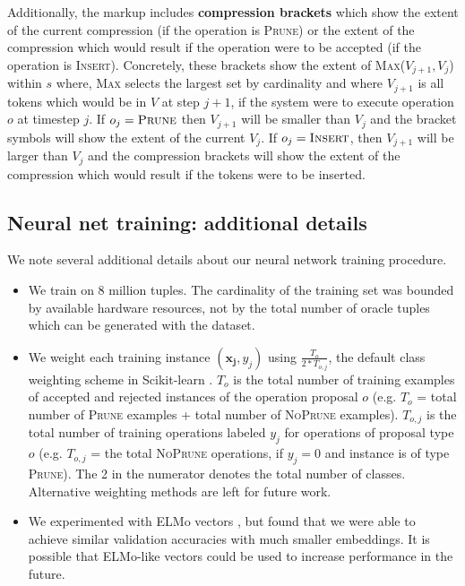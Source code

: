 Additionally, the markup includes \textbf{compression brackets} which show the extent of the current compression (if the operation is \textsc{Prune}) or the extent of the compression which would result if the operation were to be accepted (if the operation is \textsc{Insert}). Concretely, these brackets show the extent of \textsc{Max}($V_{j+1}, V_{j}$) within $s$ where, \textsc{Max} selects the largest set by cardinality and where $V_{j+1}$ is all tokens which would be in $V$ at step $j+1$, if the system were to execute operation $o$ at timestep $j$. If $o_j=\textsc{Prune}$ then $V_{j+1}$ will be smaller than $V_j$ and the bracket symbols will show the extent of the current $V_j$. If $o_j=\textsc{Insert}$, then $V_{j+1}$ will be larger than $V_j$ and the compression brackets will show the extent of the compression which would result if the tokens were to be inserted. 

\subsection{Neural net training: additional details}

We note several additional details about our neural network training procedure.

\begin{itemize}
\item{We train on 8 million tuples. The cardinality of the training set was bounded by available hardware resources, not by the total number of oracle tuples which can be generated with the \citet{filippova2013overcoming} dataset.}
\item{We weight each training instance $(\bm{x_j}, y_j)$ using $\frac{T_o}{2 * T_{o,j}}$, the default class weighting scheme in Scikit-learn \cite{Pedregosa:2011:SML:1953048.2078195}. $T_o$ is the total number of training examples of accepted and rejected instances of the operation proposal $o$ (e.g. $T_o$ = total number of \textsc{Prune} examples + total number of \textsc{NoPrune} examples). $T_{o,j}$ is the total number of training operations labeled $y_j$ for operations of proposal type $o$ (e.g. $T_{o,j}$ = the total \textsc{NoPrune} operations, if $y_j=0$ and instance is of type \textsc{Prune}). The 2 in the numerator denotes the total number of classes. Alternative weighting methods are left for future work.}
\item{We experimented with ELMo vectors \cite{Peters:2018}, but found that we were able to achieve similar validation accuracies with much smaller embeddings. It is possible that ELMo-like vectors could be used to increase performance in the future.}
\end{itemize}
